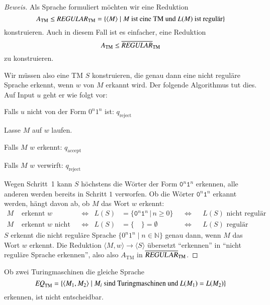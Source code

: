 \begin{proof}[Beweis]
Als Sprache formuliert möchten wir eine Reduktion 
\[
A_{\text{TM}}\le\text{\it REGULAR}_{\text{TM}}=\{
\langle M\rangle\;|\;\text{$M$ ist eine TM und $L(M)$ ist regulär}
\}
\]
%
konstruieren.
Auch in diesem Fall ist es einfacher, eine
Reduktion
\[
A_{\text{TM}}\le\overline{\text{\it REGULAR}}_{\text{TM}}
\]
zu konstruieren.

Wir müssen also eine TM $S$ konstruieren, die genau
dann eine nicht reguläre Sprache erkennt, wenn $w$ von $M$ erkannt wird.
Der folgende Algorithmus tut dies.
Auf Input $u$ geht er wie folgt
vor:
\medskip
\begin{compactenum}
\item Falls $u$ nicht von der Form $0^n1^n$ ist: $q_{\text{reject}}$
\item Lasse $M$ auf $w$ laufen.
\item Falls $M$ $w$ erkennt: $q_{\text{accept}}$
\item Falls $M$ $w$ verwirft: $q_{\text{reject}}$
\end{compactenum}
\medskip
Wegen Schritt~1 kann $S$ höchstens die Wörter der Form
$\texttt{0}^n\texttt{1}^n$ erkennen, alle anderen werden bereits in
Schritt $1$ verworfen.
Ob die Wörter 
$\texttt{0}^n\texttt{1}^n$ erkannt werden, hängt davon ab, ob $M$ das Wort
$w$ erkennt:
\begin{align*}
   M&\text{ erkennt $w$}      &
    &\Leftrightarrow&
L(S)&=\{\texttt{0}^n\texttt{1}^n\,|\, n\ge 0\}&
    &\Leftrightarrow&
    &\text{$L(S)$ nicht regulär}\\
   M&\text{ erkennt $w$ nicht}&
    &\Leftrightarrow&
L(S)&=\{\quad\}=\emptyset&
    &\Leftrightarrow&
    &\text{$L(S)$ regulär}
\end{align*}
$S$ erkennt die nicht reguläre Sprache $\{0^n1^n\;|\;n\in\mathbb N\}$
genau dann, wenn $M$ das Wort $w$ erkennt.
Die Reduktion $\langle M,w\rangle\to \langle S\rangle$ übersetzt
``erkennen'' in ``nicht reguläre Sprache erkennen'', also also $A_{\text{TM}}$
in $\overline{\textsl{REGULAR}}_{\text{TM}}$.
\end{proof}

%
\begin{satz}
Ob zwei Turingmaschinen die gleiche Sprache
\[
\text{\it EQ}_{\text{TM}}=\{
\langle M_1,M_2\rangle\;|\;\text{$M_i$ sind Turingmaschinen und $L(M_1)=L(M_2)$}
\}
\]
%
erkennen, ist nicht entscheidbar.
\end{satz}

